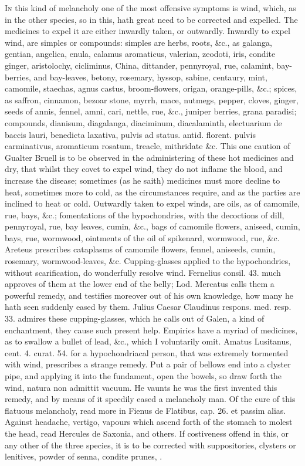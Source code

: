 \lettrine{I}{n} this kind of melancholy one of the most offensive symptoms is wind,
which, as in the other species, so in this, hath great need to be
corrected and expelled.
The medicines to expel it are either inwardly taken, or outwardly.
Inwardly to expel wind, are simples or compounds: simples are herbs,
roots, \&c., as galanga, gentian, angelica, enula, calamus aromaticus,
valerian, zeodoti, iris, condite ginger, aristolochy, cicliminus,
China, dittander, pennyroyal, rue, calamint, bay-berries, and
bay-leaves, betony, rosemary, hyssop, sabine, centaury, mint, camomile,
staechas, agnus castus, broom-flowers, origan, orange-pills, \&c.;
spices, as saffron, cinnamon, bezoar stone, myrrh, mace, nutmegs,
pepper, cloves, ginger, seeds of annis, fennel, amni, cari, nettle,
rue, \&c., juniper berries, grana paradisi; compounds, dianisum,
diagalanga, diaciminum, diacalaminth, electuarium de baccis lauri,
benedicta laxativa, pulvis ad status. antid. florent. pulvis
carminativus, aromaticum rosatum, treacle, mithridate \&c. This one
caution of Gualter Bruell is to be observed in the administering
of these hot medicines and dry, that whilst they covet to expel wind,
they do not inflame the blood, and increase the disease; sometimes (as
he saith) medicines must more decline to heat, sometimes more to cold,
as the circumstances require, and as the parties are inclined to heat
or cold.
Outwardly taken to expel winds, are oils, as of camomile, rue, bays,
\&c.; fomentations of the hypochondries, with the decoctions of dill,
pennyroyal, rue, bay leaves, cumin, \&c., bags of camomile flowers,
aniseed, cumin, bays, rue, wormwood, ointments of the oil of spikenard,
wormwood, rue, \&c. Areteus prescribes cataplasms of camomile
flowers, fennel, aniseeds, cumin, rosemary, wormwood-leaves, \&c.
Cupping-glasses applied to the hypochondries, without
scarification, do wonderfully resolve wind. Fernelius consil. 43. much
approves of them at the lower end of the belly; Lod. Mercatus
calls them a powerful remedy, and testifies moreover out of his own
knowledge, how many he hath seen suddenly eased by them. Julius Caesar
Claudinus respons. med. resp. 33. admires these cupping-glasses, which
he calls out of Galen, a kind of enchantment, they cause such
present help.
Empirics have a myriad of medicines, as to swallow a bullet of lead,
\&c., which I voluntarily omit. Amatus Lusitanus, cent. 4. curat. 54.
for a hypochondriacal person, that was extremely tormented with wind,
prescribes a strange remedy. Put a pair of bellows end into a clyster
pipe, and applying it into the fundament, open the bowels, so draw
forth the wind, natura non admittit vacuum. He vaunts he was the first
invented this remedy, and by means of it speedily eased a melancholy
man. Of the cure of this flatuous melancholy, read more in Fienus de
Flatibus, cap. 26. et passim alias.
Against headache, vertigo, vapours which ascend forth of the stomach to
molest the head, read Hercules de Saxonia, and others.
If costiveness offend in this, or any other of the three species, it is
to be corrected with suppositories, clysters or lenitives, powder of
senna, condite prunes, \etc{}. 

